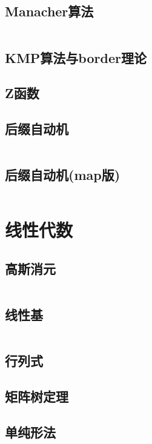\documentclass[10pt, a4paper, oneside]{ctexart}
\begin{document}
\begin{multicols}{2}
        \subsection{Manacher算法}
        \inputminted{cpp}{src/string/manacher.cpp}
        \subsection{KMP算法与border理论}
        
        \subsection{Z函数}
        
        \subsection{后缀自动机}
        \inputminted{cpp}{src/string/SAM.cpp}
        \subsection{后缀自动机(map版)}
        \inputminted[highlightlines={3,10,15,18}]{cpp}{src/string/SAM_map.cpp}

        \section{线性代数}
        \subsection{高斯消元}
        \inputminted{cpp}{src/linear/gauss.cpp}
        \subsection{线性基}
        \inputminted{cpp}{src/linear/basis.cpp}
        \subsection{行列式}
        
        \subsection{矩阵树定理}
        
        \subsection{单纯形法}
        

\end{multicols}
\end{document}
